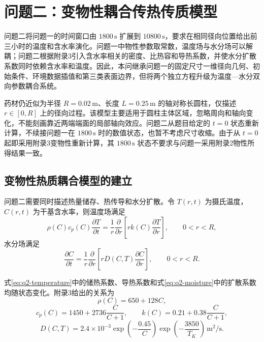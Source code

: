 \section{问题二：变物性耦合传热传质模型}

问题二将问题一的时间窗口由 $1800\,\mathrm{s}$ 扩展到 $10800\,\mathrm{s}$，要求在相同径向位置给出前三小时的温度和含水率演化。问题一中物性参数取常数，温度场与水分场可以解耦；问题二根据附录3引入含水率相关的密度、比热容和导热系数，并使水分扩散系数同时依赖含水率和温度。因此，本问继承问题一的固定尺寸一维径向几何、初始条件、环境数据插值和第三类表面边界，但将两个独立方程升级为温度—水分双向参数耦合系统。

药材仍近似为半径 $R=0.02\,\mathrm{m}$、长度 $L=0.25\,\mathrm{m}$ 的轴对称长圆柱，仅描述 $r\in[0,R]$ 上的径向过程。该模型主要适用于圆柱主体区域，忽略周向和轴向变化，不能刻画靠近两端端面的局部轴向效应。问题二从题目给定的 $t=0$ 状态重新计算，不续接问题一在 $1800\,\mathrm{s}$ 时的数值状态，也暂不考虑尺寸收缩。由于从 $t=0$ 起即采用附录3变物性重新计算，其 $1800\,\mathrm{s}$ 状态不要求与问题一采用附录2物性所得结果一致。

\subsection{变物性热质耦合模型的建立}

问题二需要同时描述热量储存、热传导和水分扩散。令 $T(r,t)$ 为摄氏温度，$C(r,t)$ 为干基含水率，则温度场满足
\begin{equation}
\rho(C)c_p(C)\frac{\partial T}{\partial t}
=\frac{1}{r}\frac{\partial}{\partial r}
\left[rk(C)\frac{\partial T}{\partial r}\right],
\qquad 0<r<R,
\label{eq:q2-temperature}
\end{equation}
水分场满足
\begin{equation}
\frac{\partial C}{\partial t}
=\frac{1}{r}\frac{\partial}{\partial r}
\left[rD(C,T)\frac{\partial C}{\partial r}\right],
\qquad 0<r<R.
\label{eq:q2-moisture}
\end{equation}

式\eqref{eq:q2-temperature}中的储热系数、导热系数和式\eqref{eq:q2-moisture}中的扩散系数均随状态变化。附录3给出的关系为
\begin{equation}
\rho(C)=650+128C,
\label{eq:q2-density}
\end{equation}
\begin{equation}
c_p(C)=1450+2736\frac{C}{C+1},
\qquad
k(C)=0.21+0.38\frac{C}{C+1},
\label{eq:q2-properties}
\end{equation}
\begin{equation}
D(C,T)=2.4\times10^{-3}
\exp\left(-\frac{0.45}{C}\right)
\exp\left(-\frac{3850}{T_K}\right)\,\mathrm{m^2/s}.
\label{eq:q2-diffusivity}
\end{equation}

